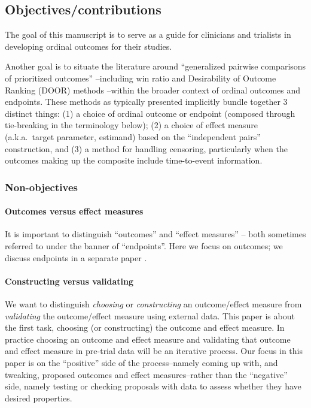 \documentclass[
  11pt,
  fleqn
]{article}
\begin{document}
\subsection{Objectives/contributions}

The goal of this manuscript is to serve as a guide for clinicians and trialists
in developing ordinal outcomes for their studies.

Another goal is to situate the literature around ``generalized pairwise
comparisons of prioritized outcomes''
\citep{buyseGeneralizedPairwiseComparisons2022}--including win ratio
\citep{pocockWinRatioNew2012} and Desirability of Outcome Ranking (DOOR)
methods \citep{evansDesirabilityOutcomeRanking2015,
ongUnlockingDOORHow2023}--within the broader context of ordinal outcomes and
endpoints. These methods as typically presented implicitly bundle
together 3 distinct things:
(1) a choice of ordinal outcome or endpoint (composed through
tie-breaking in the terminology below); (2)
a choice of effect measure (a.k.a.~target parameter, estimand) based
on the ``independent pairs'' construction, and (3) a method for
handling censoring, particularly when the outcomes making up the
composite include time-to-event information.

\subsubsection{Non-objectives}

\paragraph{Outcomes versus effect measures} It is important to distinguish
``outcomes'' and ``effect measures'' -- both sometimes referred to under the
banner of ``endpoints''. Here we focus on outcomes; we discuss endpoints in a
separate paper .

\paragraph{Constructing versus validating} We want to distinguish
\emph{choosing} or \emph{constructing} an outcome/effect measure from
\emph{validating} the outcome/effect measure using external data. This paper is
about the first task, choosing (or constructing) the outcome and effect
measure. In practice choosing an outcome and effect measure and validating that
outcome and effect measure in pre-trial data will be an iterative process. Our
focus in this paper is on the ``positive'' side of the process--namely coming
up with, and tweaking, proposed outcomes and effect measures--rather than the
``negative'' side, namely testing or checking proposals with data to assess
whether they have desired properties.
\end{document}
